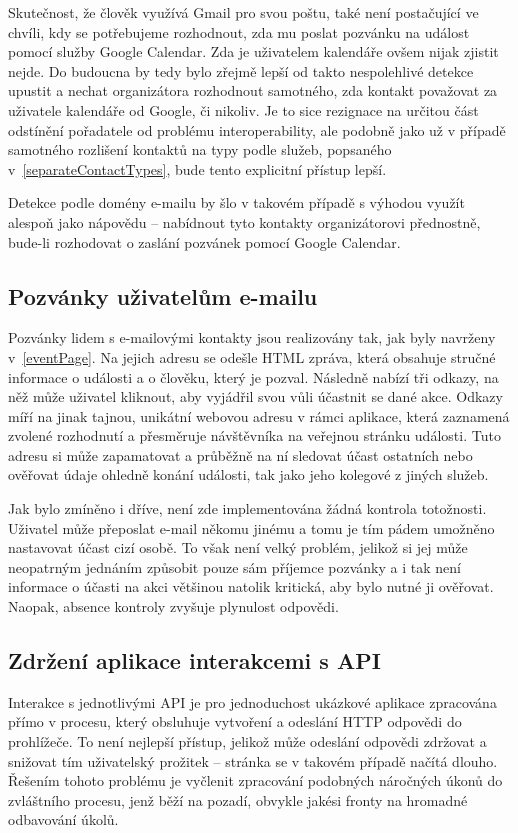 \documentclass[12pt,oneside,final]{fithesis2}
\begin{document}
Skutečnost, že člověk využívá Gmail pro svou poštu, také není postačující ve chvíli, kdy se potřebujeme rozhodnout, zda mu poslat pozvánku na událost pomocí služby Google Calendar. Zda je uživatelem kalendáře ovšem nijak zjistit nejde. Do budoucna by tedy bylo zřejmě lepší od takto nespolehlivé detekce upustit a nechat organizátora rozhodnout samotného, zda kontakt považovat za uživatele kalendáře od Google, či nikoliv. Je to sice rezignace na určitou část odstínění pořadatele od problému interoperability, ale podobně jako už v případě samotného rozlišení kontaktů na typy podle služeb, popsaného v~\ref{separateContactTypes}, bude tento explicitní přístup lepší.

Detekce podle domény e-mailu by šlo v takovém případě s výhodou využít alespoň jako nápovědu -- nabídnout tyto kontakty organizátorovi přednostně, bude-li rozhodovat o zaslání pozvánek pomocí Google Calendar.

\subsection{Pozvánky uživatelům e-mailu}
Pozvánky lidem s e-mailovými kontakty jsou realizovány tak, jak byly navrženy v~\ref{eventPage}. Na jejich adresu se odešle HTML zpráva, která obsahuje stručné informace o události a o člověku, který je pozval. Následně nabízí tři odkazy, na něž může uživatel kliknout, aby vyjádřil svou vůli účastnit se dané akce. Odkazy míří na jinak tajnou, unikátní webovou adresu v rámci aplikace, která zaznamená zvolené rozhodnutí a přesměruje návštěvníka na veřejnou stránku události. Tuto adresu si může zapamatovat a průběžně na ní sledovat účast ostatních nebo ověřovat údaje ohledně konání události, tak jako jeho kolegové z jiných služeb.

Jak bylo zmíněno i dříve, není zde implementována žádná kontrola totožnosti. Uživatel může přeposlat e-mail někomu jinému a tomu je tím pádem umožněno nastavovat účast cizí osobě. To však není velký problém, jelikož si jej může neopatrným jednáním způsobit pouze sám příjemce pozvánky a i tak není informace o účasti na akci většinou natolik kritická, aby bylo nutné ji ověřovat. Naopak, absence kontroly zvyšuje plynulost odpovědi.

\subsection{Zdržení aplikace interakcemi s API}
Interakce s jednotlivými API je pro jednoduchost ukázkové aplikace zpracována přímo v procesu, který obsluhuje vytvoření a odeslání HTTP odpovědi do prohlížeče. To není nejlepší přístup, jelikož může odeslání odpovědi zdržovat a snižovat tím uživatelský prožitek -- stránka se v takovém případě načítá dlouho. Řešením tohoto problému je vyčlenit zpracování podobných náročných úkonů do zvláštního procesu, jenž běží na pozadí, obvykle jakési fronty na hromadné odbavování úkolů.
\end{document}
